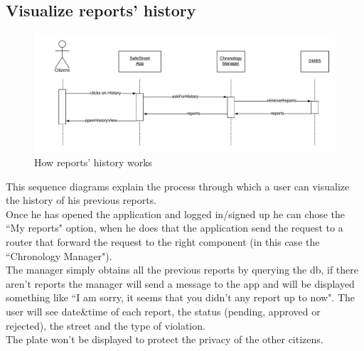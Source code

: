 \documentclass[12pt,a4paper]{report}
\begin{document}
			\subsection{Visualize reports' history}
				\begin{figure}[H]
						\includegraphics[width = \textwidth, center]{history}
						\caption{How reports' history works}
						\label{fig: diagrams}
				\end{figure}
				This sequence diagrams explain the process through which a user can visualize the history of his previous
				reports.\\
				Once he has opened the application and logged in/signed up he can chose the ``My reports" option,
				when he does that the application send the request to a router that forward the request to the right
				component (in this case the ``Chronology Manager").\\
				The manager simply obtains all the previous reports by querying the db, if there aren't reports the manager
				will send a message to the app and will be displayed something like ``I am sorry, it seems that you didn't any
				report up to now".
				The user will see date\&time of each report, the status (pending, approved or rejected), the street and the
				type of violation.\\
				The plate won't be displayed to protect the privacy of the other citizens.
\end{document}
